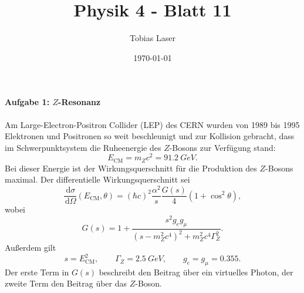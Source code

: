 \documentclass[11pt,a4paper]{scrartcl}
\newcommand{\dd}{\,\mathrm{d}}
\begin{document}
    \title{Physik 4 - Blatt 11}
    \author{Tobias Laser}
    \date{\today}
    \maketitle
    \vfill
    \thispagestyle{empty}
    \newpage


    \paragraph{Aufgabe 1: $Z$-Resonanz}

    Am Large-Electron-Positron Collider (LEP) des CERN wurden von 1989 bis 1995
    Elektronen und Positronen so weit beschleunigt und zur Kollision gebracht, dass
    im Schwerpunktsystem die Ruheenergie des $Z$-Bosons zur Verfügung stand:
    \[
        E_{\mathrm{CM}}=m_Zc^2=\SI{91.2}{GeV}.
    \]
    Bei dieser Energie ist der Wirkungsquerschnitt für die Produktion des $Z$-Bosons maximal.
    Der differentielle Wirkungsquerschnitt sei
    \[
        \frac{\dd\sigma}{\dd\Omega}(E_{\mathrm{CM}},\theta)
        = (\hbar c)^2\frac{\alpha^2}{s}\frac{G(s)}{4}
        \left(1+\cos^2\theta\right),
    \]
    wobei
    \[
        G(s)=1+\frac{s^2g_eg_\mu}{(s-m_Z^2c^4)^2+m_Z^2c^4\Gamma_Z^2}.
    \]
    Außerdem gilt
    \[
        s=E_{\mathrm{CM}}^2,\qquad
        \Gamma_Z=\SI{2.5}{GeV},\qquad
        g_e=g_\mu=0.355.
    \]
    Der erste Term in $G(s)$ beschreibt den Beitrag über ein virtuelles Photon,
    der zweite Term den Beitrag über das $Z$-Boson.
\end{document}
